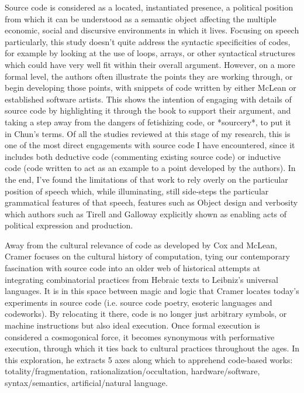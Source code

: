 Source code is considered as a located, instantiated presence, a political position from which it can be understood as a semantic object affecting the multiple economic, social and discursive environments in which it lives. Focusing on speech particularly, this study doesn't quite address the syntactic specificities of codes, for example by looking at the use of loops, arrays, or other syntactical structures which could have very well fit within their overall argument. However, on a more formal level, the authors often illustrate the points they are working through, or begin developing those points, with snippets of code written by either McLean or established software artists. This shows the intention of engaging with details of source code by highlighting it through the book to support their argument, and taking a step away from the dangers of fetishizing code, or *sourcery*, to put it in Chun's terms. Of all the studies reviewed at this stage of my research, this is one of the most direct engagements with source code I have encountered, since it includes both deductive code (commenting existing source code) or inductive code (code written to act as an example to a point developed by the authors). In the end, I've found the limitations of that work to rely overly on the particular position of speech which, while illuminating, still side-steps the particular grammatical features of that speech, features such as Object design and verbosity which authors such as Tirell and Galloway explicitly shown as enabling acts of political expression and production.

Away from the cultural relevance of code as developed by Cox and McLean, Cramer focuses on the cultural history of computation, tying our contemporary fascination with source code into an older web of historical attempts at integrating combinatorial practices from Hebraic texts to Leibniz's universal languages. It is in this space between magic and logic that Cramer locates today's experiments in source code (i.e. source code poetry, esoteric languages and codeworks). By relocating it there, code is no longer just arbitrary symbols, or machine instructions but also ideal execution. Once formal execution is considered a cosmogonical force, it becomes synonymous with performative execution, through which it ties back to cultural practices throughout the ages. In this exploration, he extracts 5 axes along which to apprehend code-based works: totality/fragmentation, rationalization/occultation, hardware/software, syntax/semantics, artificial/natural language.

